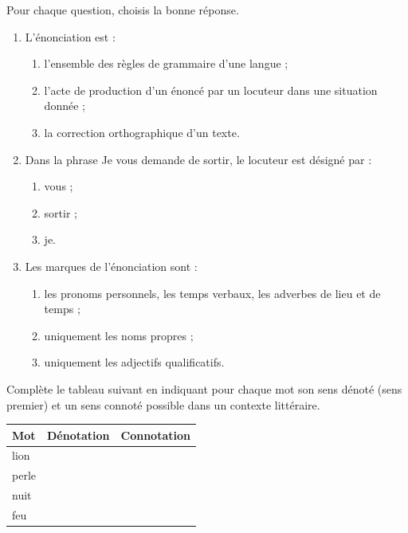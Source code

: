 \documentclass[11pt]{article}
\begin{document}
\begin{exercice}
Pour chaque question, choisis la bonne réponse.
\begin{enumerate}
\item L'énonciation est :
\begin{enumerate}
\item l'ensemble des règles de grammaire d'une langue ;
\item l'acte de production d'un énoncé par un locuteur dans une situation donnée ;
\item la correction orthographique d'un texte.
\end{enumerate}
\item Dans la phrase \og{}Je vous demande de sortir\fg{}, le locuteur est désigné par :
\begin{enumerate}
\item \og{}vous\fg{} ; \quad \item \og{}sortir\fg{} ; \quad \item \og{}je\fg{}.
\end{enumerate}
\item Les marques de l'énonciation sont :
\begin{enumerate}
\item les pronoms personnels, les temps verbaux, les adverbes de lieu et de temps ;
\item uniquement les noms propres ;
\item uniquement les adjectifs qualificatifs.
\end{enumerate}
\end{enumerate}
\end{exercice}

\begin{exercice}
Complète le tableau suivant en indiquant pour chaque mot son sens dénoté (sens premier) et un sens connoté possible dans un contexte littéraire.

\begin{tabular}{|l|l|l|}
\hline
\textbf{Mot} & \textbf{Dénotation} & \textbf{Connotation} \\
\hline
lion & & \\
\hline
perle & & \\
\hline
nuit & & \\
\hline
feu & & \\
\hline
\end{tabular}
\end{exercice}
\end{document}
